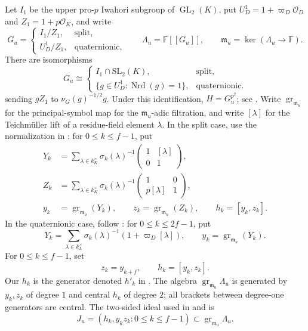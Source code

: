 \documentclass[11pt]{article}
\numberwithin{equation}{section}
\theoremstyle{definition}
\theoremstyle{remark}
\newcommand{\F}{\mathbb F}
\newcommand{\cO}{\mathcal O}
\DeclareMathOperator{\GL}{GL}
\DeclareMathOperator{\Nrd}{Nrd}
\DeclareMathOperator{\gr}{gr}
\begin{document}
Let $I_1$ be the upper pro-$p$ Iwahori subgroup of $\GL_2(K)$,
put $U_D^1=1+\varpi_D\cO_D$ and $Z_1=1+p\cO_K$, and write
\[
 G_u=\begin{cases}I_1/Z_1,&\text{split},\\
                   U_D^1/Z_1,&\text{quaternionic},\end{cases}
 \qquad \Lambda_u=\F[[G_u]],\qquad
 \mathfrak m_u=\ker(\Lambda_u\to\F).
\]
There are isomorphisms
\[
 G_u\cong
 \begin{cases}
  I_1\cap\mathrm{SL}_2(K),&\text{split},\\
  \{g\in U_D^1:\Nrd(g)=1\},&\text{quaternionic}.
 \end{cases}
\]
sending $gZ_1$ to $\nu_G(g)^{-1/2}g$. 
Under this identification, $H=G_u^{p^2}$; see
\cite[Prop.~2]{Sor26a}.
Write $\gr_{\mathfrak m_u}$ for the principal-symbol map for the
$\mathfrak m_u$-adic filtration, and write $[\lambda]$ for the
Teichm\"uller lift of a residue-field element $\lambda$.
In the split case, use the normalization in
\cite[(3.1), (3.17)]{BHH25}: for $0\leq k\leq f-1$, put
\[
 \begin{aligned}
 Y_k&=\sum_{\lambda\in k_K^\times}\sigma_k(\lambda)^{-1}
             \begin{pmatrix}1&[\lambda]\\0&1\end{pmatrix},\\
 Z_k&=\sum_{\lambda\in k_K^\times}\sigma_k(\lambda)^{-1}
             \begin{pmatrix}1&0\\p[\lambda]&1\end{pmatrix},\\
 y_k&=\gr_{\mathfrak m_u}(Y_k),\qquad z_k=\gr_{\mathfrak m_u}(Z_k),\qquad
 h_k=[y_k,z_k].
 \end{aligned}
\]
In the quaternionic case, follow \cite[\S~2.3]{HW24}: for
$0\leq k\leq 2f-1$, put
\[
 Y_k=\sum_{\lambda\in k_L^\times}\sigma_k(\lambda)^{-1}
                    (1+\varpi_D[\lambda]),
 \qquad y_k=\gr_{\mathfrak m_u}(Y_k).
\]
For $0\leq k\leq f-1$, set
\[
 z_k=y_{k+f},\qquad h_k=[y_k,z_k].
\]
Our $h_k$ is the generator denoted $h'_k$ in
\cite[Prop.~2.9]{HW24}.
The algebra $\gr_{\mathfrak m_u}\Lambda_u$ is generated by
$y_k,z_k$ of degree $1$ and central $h_k$ of degree $2$;
all brackets between degree-one generators are central.
The two-sided ideal used in \cite[\S~5.3]{BHH23} and
\cite[Cor.~2.10]{HW24} is
\[
 J_u=(h_k,y_kz_k:0\leq k\leq f-1)\subset\gr_{\mathfrak m_u}\Lambda_u.
\]
\end{document}
